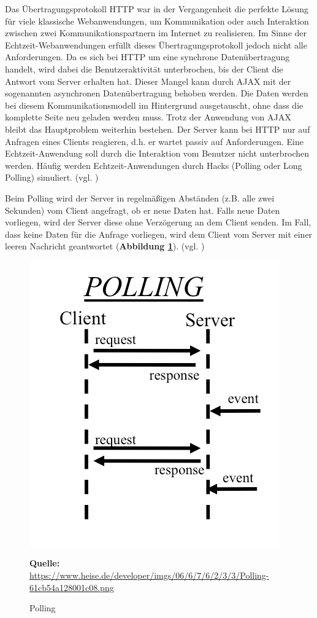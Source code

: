 Das Übertragungsprotokoll HTTP war in der Vergangenheit die perfekte Lösung für viele klassische Webanwendungen, um Kommunikation oder auch Interaktion zwischen zwei Kommunikationspartnern im Internet zu realisieren. Im Sinne der Echtzeit-Webanwendungen erfüllt dieses Übertragungsprotokoll jedoch nicht alle Anforderungen. Da es sich bei HTTP um eine synchrone Datenübertragung handelt, wird dabei die Benutzeraktivität unterbrochen, bis der Client die Antwort vom Server erhalten hat. Dieser Mangel kann durch AJAX mit der sogenannten asynchronen Datenübertragung behoben werden. Die Daten werden bei diesem Kommunikationsmodell im Hintergrund ausgetauscht, ohne dass die komplette Seite neu geladen werden muss. Trotz der Anwendung von AJAX bleibt das Hauptproblem weiterhin bestehen. Der Server kann bei HTTP nur auf Anfragen eines Clients reagieren, d.h. er wartet passiv auf Anforderungen. Eine Echtzeit-Anwendung soll durch die Interaktion vom Benutzer nicht unterbrochen werden. Häufig werden Echtzeit-Anwendungen durch Hacks (Polling oder Long Polling) simuliert. (vgl. \cite{Mar.o.D.})\bigskip

Beim Polling wird der Server in regelmäßigen Abständen (z.B. alle zwei Sekunden) vom Client angefragt, ob er neue Daten hat. Falls neue Daten vorliegen, wird der Server diese ohne Verzögerung an dem Client senden. Im Fall, dass keine Daten für die Anfrage vorliegen, wird dem Client vom Server mit einer leeren Nachricht geantwortet (\textbf{Abbildung \ref{fig:polling}}). (vgl. \cite{Mar2013})

\begin{figure}[H]
  \begin{center}
    \includegraphics[scale=0.4]{img/polling}
	\caption{Polling}
	\footnotesize\sffamily\textbf{Quelle:} \url{https://www.heise.de/developer/imgs/06/6/7/6/2/3/3/Polling-61cb54a128001c08.png} 
	\label{fig:polling}
  \end{center}   
\end{figure}

